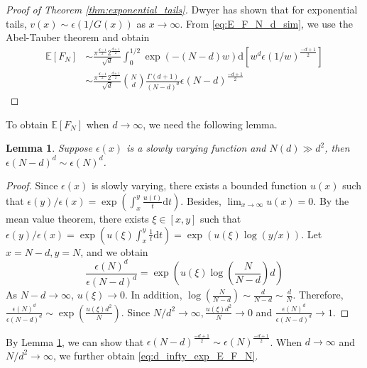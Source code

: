 \documentclass[conference,a4paper]{IEEEtran}
\def\E{\mathbb{E}}
\def\d{\mathrm{d}}
\newtheorem{lemma}{Lemma}
\begin{document}
\begin{proof}[Proof of Theorem \ref{thm:exponential_tails}]
Dwyer \cite{dwyer1991convex} has shown that for exponential tails, $v(x) \sim \epsilon(1/G(x))$ as $x\to \infty$.
From \eqref{eq:E_F_N_d_sim},
we use the Abel-Tauber theorem
\cite{omey1989abelian} and obtain
\begin{align*}
    \E[F_N] & \sim \frac{\pi^{\frac{d-1}{2}} 2^{\frac{d+1}{2}}}{\sqrt{d}}\int_0^{1/2} \exp(-(N-d)w) \d [w^d \epsilon(1/w)^{\frac{-d+1}{2}}] \\
    &\sim \frac{\pi^{\frac{d-1}{2}} 2^{\frac{d+1}{2}}}{\sqrt{d}} \binom{N}{d}\frac{\Gamma(d+1)}{(N-d)^d} \epsilon(N-d)^{\frac{-d+1}{2}}
\end{align*}
\end{proof}

To obtain $\E[F_N]$ when $d\to \infty$,
we need the following lemma.
\begin{lemma}\label{lem:ratio_epsilon}
     Suppose $\epsilon(x)$ is a slowly varying function
     and $N(d)\gg d^2$,
     then $\epsilon(N-d)^{d} \sim \epsilon(N)^d$.
\end{lemma}
\begin{proof}
     Since $\epsilon(x)$ is slowly varying, there exists
     a bounded function $u(x)$ such that
     $\epsilon(y)/\epsilon(x)=\exp(\int_{x}^y \frac{u(t)}{t}\d t)$.
     Besides, $\lim_{x\to \infty} u(x) = 0$.
     By the mean value theorem, there exists $\xi \in [x,y]$ such that
     $\epsilon(y)/\epsilon(x)=\exp(u(\xi)\int_{x}^y \frac{1}{t}\d t)
     =\exp(u(\xi)\log(y/x))$. Let $x=N-d, y=N$, and we obtain
     \begin{equation*}
          \frac{\epsilon(N)^d}{\epsilon(N-d)^d}
          = \exp \left(u(\xi) \log\left(\frac{N}{N-d} \right)d \right)
     \end{equation*}
     As $N-d\to \infty$, $u(\xi)\to 0$. In addition,
     $\log(\frac{N}{N-d}) \sim \frac{d}{N-d} \sim \frac{d}{N}$.
     Therefore,
     $\frac{\epsilon(N)^d}{\epsilon(N-d)^d}\sim \exp(\frac{u(\xi)d^2}{N})
     $. Since $N/d^2 \to \infty, \frac{u(\xi)d^2}{N} \to 0$ and
     $\frac{\epsilon(N)^d}{\epsilon(N-d)^d}\to 1$.
\end{proof}
By Lemma \ref{lem:ratio_epsilon}, we can show that
$\epsilon(N-d)^{\frac{-d+1}{2}}\sim \epsilon(N)^{\frac{-d+1}{2}}$.
When $d\to\infty$ and $N/d^2\to \infty$, we further obtain \eqref{eq:d_infty_exp_E_F_N}.
 
\end{document}
